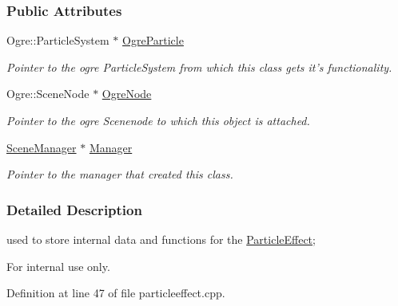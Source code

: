 \subsubsection*{Public Attributes}
\begin{DoxyCompactItemize}
\item 
Ogre::ParticleSystem $\ast$ \hyperlink{structphys_1_1internal_1_1ParticleEffectInternalData_a2a9776a843e39608d4a4583e4558a2c0}{OgreParticle}
\begin{DoxyCompactList}\small\item\em Pointer to the ogre ParticleSystem from which this class gets it's functionality. \item\end{DoxyCompactList}\item 
Ogre::SceneNode $\ast$ \hyperlink{structphys_1_1internal_1_1ParticleEffectInternalData_a339dac2408197459041f2524badc619e}{OgreNode}
\begin{DoxyCompactList}\small\item\em Pointer to the ogre Scenenode to which this object is attached. \item\end{DoxyCompactList}\item 
\hyperlink{classphys_1_1SceneManager}{SceneManager} $\ast$ \hyperlink{structphys_1_1internal_1_1ParticleEffectInternalData_a6e039c2445dcaac7f9a586863affe030}{Manager}
\begin{DoxyCompactList}\small\item\em Pointer to the manager that created this class. \item\end{DoxyCompactList}\end{DoxyCompactItemize}


\subsubsection{Detailed Description}
used to store internal data and functions for the \hyperlink{classphys_1_1ParticleEffect}{ParticleEffect}; \begin{DoxyInternal}{For internal use only.}
\end{DoxyInternal}


Definition at line 47 of file particleeffect.cpp.



